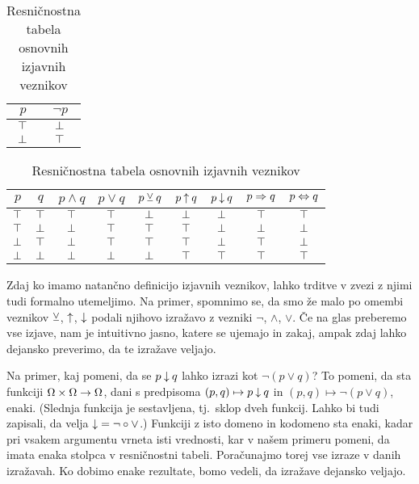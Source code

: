 		\begin{table}[!ht]
			\centering
			\begin{tabular}{c|c}
				$p$ & $\lnot{p}$ \\
				\hline
				$\top$ & $\bot$ \\
				$\bot$ & $\top$
			\end{tabular}
			\qquad\quad
			\begin{tabular}{cc|ccccccc}
				$p$ & $q$ & $p \land q$ & $p \lor q$ & $p \mathbin{\veebar} q$ & $p \mathbin{\uparrow} q$ & $p \mathbin{\downarrow} q$ & $p \Rightarrow q$ & $p \Leftrightarrow q$ \\
				\hline
				$\top$ & $\top$ & $\top$ & $\top$ & $\bot$ & $\bot$ & $\bot$ & $\top$ & $\top$ \\
				$\top$ & $\bot$ & $\bot$ & $\top$ & $\top$ & $\top$ & $\bot$ & $\bot$ & $\bot$ \\
				$\bot$ & $\top$ & $\bot$ & $\top$ & $\top$ & $\top$ & $\bot$ & $\top$ & $\bot$ \\
				$\bot$ & $\bot$ & $\bot$ & $\bot$ & $\bot$ & $\top$ & $\top$ & $\top$ & $\top$
			\end{tabular}
			\caption{Resničnostna tabela osnovnih izjavnih veznikov}\label{TABELA: Resničnostna tabela osnovnih izjavnih veznikov}
		\end{table}
		
		Zdaj ko imamo natančno definicijo izjavnih veznikov, lahko trditve v zvezi z njimi tudi formalno utemeljimo. Na primer, spomnimo se, da smo že malo po omembi veznikov $\mathbin{\veebar}$, $\mathbin{\uparrow}$, $\mathbin{\downarrow}$ podali njihovo izražavo z vezniki $\lnot$, $\land$, $\lor$. Če na glas preberemo vse izjave, nam je intuitivno jasno, katere se ujemajo in zakaj, ampak zdaj lahko dejansko preverimo, da te izražave veljajo.
		
		Na primer, kaj pomeni, da se $p \mathbin{\downarrow} q$ lahko izrazi kot $\lnot(p \lor q)$? To pomeni, da sta funkciji $\Omega \times \Omega \to \Omega$, dani s predpisoma $(p, q) \mapsto p \mathbin{\downarrow} q$ in $(p, q) \mapsto \lnot(p \lor q)$, enaki. (Slednja funkcija je sestavljena, tj.~sklop dveh funkcij. Lahko bi tudi zapisali, da velja $\mathbin{\downarrow} = \lnot \circ \lor$.) Funkciji z isto domeno in kodomeno sta enaki, kadar pri vsakem argumentu vrneta isti vrednosti, kar v našem primeru pomeni, da imata enaka stolpca v resničnostni tabeli. Poračunajmo torej vse izraze v danih izražavah. Ko dobimo enake rezultate, bomo vedeli, da izražave dejansko veljajo.
		
